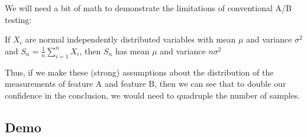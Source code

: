 \documentclass[]{beamer}
\theoremstyle{definition}
\begin{document}
\begin{frame}
We will need a bit of math to demonstrate the limitations of conventional A/B testing:
\begin{theorem}
If $X_i$ are normal independently distributed variables with mean $\mu$ and variance $\sigma^2$ and $S_n = \frac{1}{n}\sum_{i=1}^n X_i$, then $S_n$ has mean $\mu$ and variance $n\sigma^2$ 
\end{theorem}
Thus, if we make these (strong) assumptions about the distribution of the measurements of feature A and feature B, then we can see that to double our confidence in the conclusion, we would need to quadruple the number of samples.
\end{frame}

\subsection{Demo}

\end{document}
